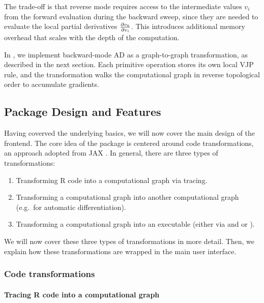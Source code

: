 The trade-off is that reverse mode requires access to the intermediate values \(v_i\) from the forward evaluation during the backward sweep, since they are needed to evaluate the local partial derivatives \(\frac{\partial v_k}{\partial v_i}\).
This introduces additional memory overhead that scales with the depth of the computation.

In , we implement backward-mode AD as a graph-to-graph transformation, as described in the next section.
Each primitive operation stores its own local VJP rule, and the transformation walks the computational graph in reverse topological order to accumulate gradients.

\subsection{Package Design and Features}\label{package-design-and-features}

Having coverved the underlying basics, we will now cover the main design of the  frontend.
The core idea of the package is centered around code transformations, an approach adopted from JAX \citep{ref-jax}.
In general, there are three types of transformations:

\begin{enumerate}
\def\labelenumi{\arabic{enumi}.}
\tightlist
\item
  Transforming R code into a computational graph via tracing.
\item
  Transforming a computational graph into another computational graph (e.g.~for automatic differentiation).
\item
  Transforming a computational graph into an executable (either via  and  or ).
\end{enumerate}

We will now cover these three types of transformations in more detail.
Then, we explain how these transformations are wrapped in the main user interface.

\subsubsection{Code transformations}\label{code-transformations}

\paragraph{Tracing R code into a computational graph}\label{tracing-r-code-into-a-computational-graph}

